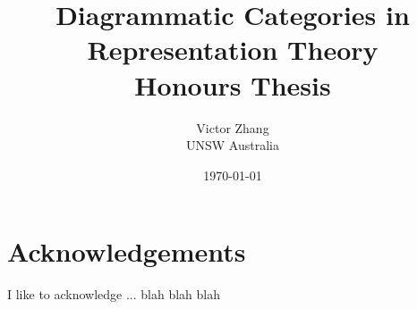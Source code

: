 \documentclass[12pt]{report}
\title{Diagrammatic Categories in Representation Theory\\
Honours Thesis\\
\red{(Draft)}}
\author{Victor Zhang\\
    UNSW Australia}
\date{\today}
\begin{document}
\maketitle

\chapter*{Acknowledgements}
\thispagestyle{empty}

I like to acknowledge ... blah blah blah


\tableofcontents
\thispagestyle{empty}
\clearpage

\setcounter{page}{1}













\printbibliography
\end{document}
